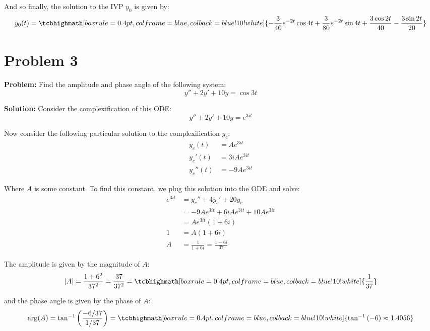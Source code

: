 \documentclass{article}
\begin{document}
And so finally, the solution to the IVP $y_0$ is given by:
\begin{equation*}
  y_0(t)=\tcbhighmath[boxrule=0.4pt,colframe=blue,colback=blue!10!white]{-\frac{3}{40}e^{-2t}\cos 4t+\frac{3}{80}e^{-2t}\sin4t+\frac{3\cos 2t}{40}-\frac{3\sin2t}{20}}
\end{equation*}

\section*{Problem 3}
\noindent\textbf{Problem:} Find the amplitude and phase angle of the following system:
\begin{equation*}
  y''+2y'+10y=\cos3t
\end{equation*}

\noindent\textbf{Solution:} Consider the complexification of this ODE:
\begin{equation*}
  y''+2y'+10y=e^{3it}
\end{equation*}

Now consider the following particular solution to the complexification $y_c$:
\begin{align*}
  y_c(t)&=Ae^{3it}\\
  y_c'(t)&=3iAe^{3it}\\
  y_c''(t)&=-9Ae^{3it}
\end{align*}

Where $A$ is some constant. To find this constant, we plug this solution into the ODE and solve:
\begin{align*}
  e^{3it}&=y_c''+4y_c'+20y_c\\
  &=-9Ae^{3it}+6iAe^{3it}+10Ae^{3it}\\
  &=Ae^{3it}(1+6i)\\
  1&=A(1+6i)\\
  A&=\frac{1}{1+6i}=\frac{1-6i}{37}
\end{align*}

The amplitude is given by the magnitude of $A$:
\begin{equation*}
  |A|=\frac{1+6^2}{37^2}=\frac{37}{37^2}=\tcbhighmath[boxrule=0.4pt,colframe=blue,colback=blue!10!white]{\frac{1}{37}}
\end{equation*}

and the phase angle is given by the phase of $A$:
\begin{equation*}
  \operatorname{arg}(A)=\tan^{-1}\left(\frac{-6/37}{1/37}\right)=\tcbhighmath[boxrule=0.4pt,colframe=blue,colback=blue!10!white]{\tan^{-1}\left(-6\right)\approx1.4056}
\end{equation*}
\end{document}
